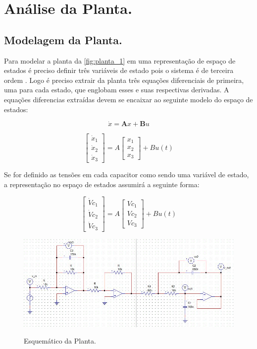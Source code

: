 \documentclass[
	article,			%
	11pt,				%
	oneside,			%
	a4paper,			%
	english,			%
	brazil,				%
	sumario=tradicional
	]{abntex2}
\begin{document}
\pagebreak

\section{\textbf{Análise da Planta.}}

\subsection{Modelagem da Planta.}

Para modelar a planta da \autoref{fig:planta_1} em uma representação de espaço de estados é preciso definir três variáveis de estado pois o sistema é de terceira ordem \cite{Ogata2014}. 
Logo é preciso extrair da planta três equações diferenciais de primeira, uma para cada estado, que englobam esses e suas respectivas derivadas. 
A equações diferencias extraídas devem se encaixar ao seguinte modelo do espaço de estados:

$$
\dot x = \textbf{A}x + \textbf{B}u
$$

$$
\left[
\begin{array}{ccc}
\dot x_1 \\
\dot x_2 \\
\dot x_3
\end{array}
\right]
 = 
A
\left[
\begin{array}{ccc}
x_1\\
x_2\\
x_3
\end{array}
\right]
+
B
u(t)
$$

Se for definido as tensões em cada capacitor como sendo uma variável de estado, a representação no espaço de estados assumirá a seguinte forma:

$$
\left[
\begin{array}{ccc}
\dot Vc_1 \\
\dot Vc_2 \\
\dot Vc_3
\end{array}
\right]
 = 
A
\left[
\begin{array}{ccc}
Vc_1\\
Vc_2\\
Vc_3
\end{array}
\right]
+
B
u(t)
$$

\begin{figure}[htb!]
	\centering
	\caption{Esquemático da Planta.}
	\includegraphics[scale=0.6]{./img/planta_1.JPG}
	\label{fig:planta_1}
\end{figure}
\end{document}
